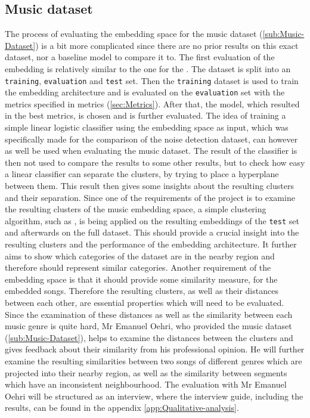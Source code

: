 \subsection{Music dataset}
\label{sub:Eval-Music}
The process of evaluating the embedding space for the music dataset (\ref{sub:Music-Dataset}) is a bit more complicated since there are no prior results on this exact dataset, nor a baseline model to compare it to. The first evaluation of the embedding is relatively similar to the one for the . The dataset is split into an \texttt{training}, \texttt{evaluation} and \texttt{test} set. Then the \texttt{training} dataset is used to train the embedding architecture and is evaluated on the \texttt{evaluation} set with the metrics specified in metrics (\ref{sec:Metrics}). After that, the model, which resulted in the best metrics, is chosen and is further evaluated.
\newline
\newline
The idea of training a simple linear logistic classifier using the embedding space as input, which was specifically made for the comparison of the noise detection dataset, can however as well be used when evaluating the music dataset. The result of the classifier is then not used to compare the results to some other results, but to check how easy a linear classifier can separate the clusters, by trying to place a hyperplane between them. This result then gives some insights about the resulting clusters and their separation.
\newline
\newline
Since one of the requirements of the project is to examine the resulting clusters of the music embedding space, a simple clustering algorithm, such as , is being applied on the resulting embeddings of the \texttt{test} set and afterwards on the full dataset. This should provide a crucial insight into the resulting clusters and the performance of the embedding architecture. It further aims to show which categories of the dataset are in the nearby region and therefore should represent similar categories. 
\newline
\newline
Another requirement of the embedding space is that it should provide some similarity measure, for the embedded songs. Therefore the resulting clusters, as well as their distances between each other, are essential properties which will need to be evaluated. Since the examination of these distances as well as the similarity between each music genre is quite hard, Mr Emanuel Oehri, who provided the music dataset (\ref{sub:Music-Dataset}), helps to examine the distances between the clusters and gives feedback about their similarity from his professional opinion. He will further examine the resulting similarities between two songs of different genres which are projected into their nearby region, as well as the similarity between segments which have an inconsistent neighbourhood. The evaluation with Mr Emanuel Oehri will be structured as an interview, where the interview guide, including the results, can be found in the appendix \ref{app:Qualitative-analysis}.

